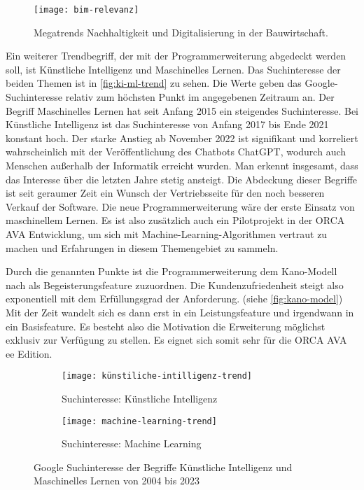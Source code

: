 \begin{figure}[h]
	\centering
	\texttt{[image: bim-relevanz]}
	\caption{Megatrends Nachhaltigkeit und Digitalisierung in der Bauwirtschaft.}
	\label{fig:bim}
\end{figure}
Ein weiterer Trendbegriff, der mit der Programmerweiterung abgedeckt werden soll, ist \glqq Künstliche Intelligenz\grqq{} und \glqq Maschinelles Lernen\grqq{}. Das Suchinteresse der beiden Themen ist in \autoref{fig:ki-ml-trend} zu sehen. Die Werte geben das Google-Suchinteresse relativ zum höchsten Punkt im angegebenen Zeitraum an. Der Begriff \glqq Maschinelles Lernen\grqq{} hat seit Anfang 2015 ein steigendes Suchinteresse. Bei \glqq Künstliche Intelligenz\grqq{} ist das Suchinteresse von Anfang 2017 bis Ende 2021 konstant hoch. Der starke Anstieg ab November 2022 ist signifikant und korreliert wahrscheinlich mit der Veröffentlichung des Chatbots ChatGPT, wodurch auch Menschen außerhalb der Informatik erreicht wurden. Man erkennt insgesamt, dass das Interesse über die letzten Jahre stetig ansteigt. Die Abdeckung dieser Begriffe ist seit geraumer Zeit ein Wunsch der Vertriebsseite für den noch besseren Verkauf der Software. Die neue Programmerweiterung wäre der erste Einsatz von maschinellem Lernen. Es ist also zusätzlich auch ein Pilotprojekt in der ORCA AVA Entwicklung, um sich mit Machine-Learning-Algorithmen vertraut zu machen und Erfahrungen in diesem Themengebiet zu sammeln. 

Durch die genannten Punkte ist die Programmerweiterung dem Kano-Modell nach als Begeisterungsfeature zuzuordnen. Die Kundenzufriedenheit steigt also exponentiell mit dem Erfüllungsgrad der Anforderung. (siehe \autoref{fig:kano-model}) Mit der Zeit wandelt sich es dann erst in ein Leistungsfeature und irgendwann in ein Basisfeature. \citep[vgl.][p.~3-4]{Hölzing_2008} Es besteht also die Motivation die Erweiterung möglichst exklusiv zur Verfügung zu stellen. Es eignet sich somit sehr für die ORCA AVA \ac{ee} Edition.

\begin{figure}[tb]
	\centering
	
	\begin{subfigure}{0.99\textwidth}
		\centering
	\texttt{[image: künstiliche-intilligenz-trend]}
		\caption{Suchinteresse: Künstliche Intelligenz}
		\label{FIG:ki-trend}
	\end{subfigure}
	\hspace{1cm}
	\begin{subfigure}{0.99\textwidth}
		\centering
	\texttt{[image: machine-learning-trend]}
		\caption{Suchinteresse: Machine Learning}
		\label{FIG:ml-trend}
	\end{subfigure}
	
	\caption[Google Suchinteresse von \glqq Künstliche Intelligenz\grqq{} und \glqq Maschinelles Lernen{}]{Google Suchinteresse der Begriffe \glqq Künstliche Intelligenz\grqq{} und \glqq Maschinelles Lernen\grqq{} von 2004 bis 2023}
	\label{fig:ki-ml-trend}
\end{figure}


